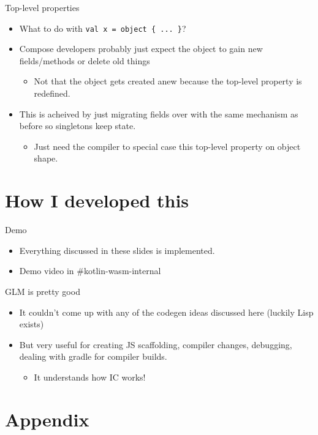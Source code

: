 \documentclass[10pt,presentation]{beamer}
\begin{document}
\begin{frame}[label={sec:org74ea8ca},fragile]{Top-level properties}
 \begin{itemize}
\item What to do with \texttt{val x = object \{ ... \}}?
\item Compose developers probably just expect the object to gain new
fields/methods or delete old things
\begin{itemize}
\item Not that the object gets created anew because the top-level
property is redefined.
\end{itemize}
\item This is acheived by just migrating fields over with the same
mechanism as before so singletons keep state.
\begin{itemize}
\item Just need the compiler to special case this top-level property on
object shape.
\end{itemize}
\end{itemize}
\end{frame}
\section*{How I developed this}
\label{sec:org66786d6}
\begin{frame}[label={sec:org0a993c6}]{Demo}
\begin{itemize}
\item Everything discussed in these slides is implemented.
\item Demo video in \#kotlin-wasm-internal
\end{itemize}
\end{frame}
\begin{frame}[label={sec:orgbdeeb64}]{GLM is pretty good}
\begin{itemize}
\item It couldn't come up with any of the codegen ideas discussed here
(luckily Lisp exists)
\item But very useful for creating JS scaffolding, compiler changes,
debugging, dealing with gradle for compiler builds.
\begin{itemize}
\item It understands how IC works!
\end{itemize}
\end{itemize}
\end{frame}
\section*{Appendix}
\label{sec:org8ec908e}
\end{document}
